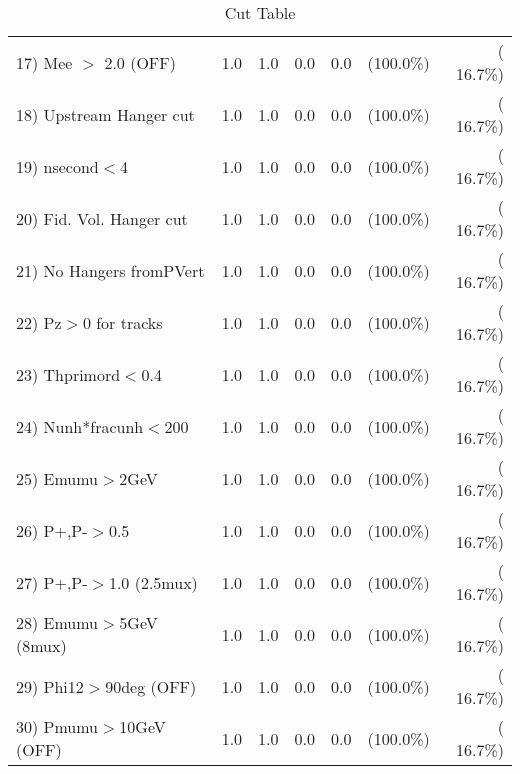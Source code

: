 \begin{table}[h!]
\begin{tabular}{||l||r|r|r|r|r|r||}
 17) Mee $>$ 2.0  (OFF)   &          1.0 &          1.0 &          0.0 &          0.0 & (100.0\%) & ( 16.7\%) \\
 18) Upstream Hanger cut  &          1.0 &          1.0 &          0.0 &          0.0 & (100.0\%) & ( 16.7\%) \\
 19) nsecond$<$4          &          1.0 &          1.0 &          0.0 &          0.0 & (100.0\%) & ( 16.7\%) \\
 20) Fid. Vol. Hanger cut &          1.0 &          1.0 &          0.0 &          0.0 & (100.0\%) & ( 16.7\%) \\
 21) No Hangers fromPVert &          1.0 &          1.0 &          0.0 &          0.0 & (100.0\%) & ( 16.7\%) \\
 22) Pz$>$0 for tracks    &          1.0 &          1.0 &          0.0 &          0.0 & (100.0\%) & ( 16.7\%) \\
 23) Thprimord$<$0.4      &          1.0 &          1.0 &          0.0 &          0.0 & (100.0\%) & ( 16.7\%) \\
 24) Nunh*fracunh$<$200   &          1.0 &          1.0 &          0.0 &          0.0 & (100.0\%) & ( 16.7\%) \\
 25) Emumu$>$2GeV         &          1.0 &          1.0 &          0.0 &          0.0 & (100.0\%) & ( 16.7\%) \\
 26) P+,P-$>$0.5          &          1.0 &          1.0 &          0.0 &          0.0 & (100.0\%) & ( 16.7\%) \\
 27) P+,P-$>$1.0 (2.5mux) &          1.0 &          1.0 &          0.0 &          0.0 & (100.0\%) & ( 16.7\%) \\
 28) Emumu$>$5GeV  (8mux) &          1.0 &          1.0 &          0.0 &          0.0 & (100.0\%) & ( 16.7\%) \\
 29) Phi12$>$90deg  (OFF) &          1.0 &          1.0 &          0.0 &          0.0 & (100.0\%) & ( 16.7\%) \\
 30) Pmumu$>$10GeV  (OFF) &          1.0 &          1.0 &          0.0 &          0.0 & (100.0\%) & ( 16.7\%) \\
 \hline
 \hline
 \end{tabular}
 \caption{Cut Table           }
 \label{tab-cutheavy_neutrino_1.000}
 \end{table}
